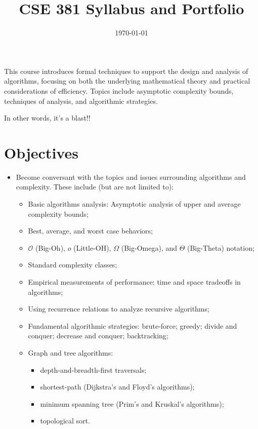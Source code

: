 \documentclass[12pt]{amsart}
\title{CSE 381 Syllabus and Portfolio}
\date{\today}
\begin{document}
\maketitle
This course introduces formal techniques to support the design and
  analysis of algorithms, focusing on both the underlying mathematical
  theory and practical considerations of efficiency. Topics include
  asymptotic complexity bounds, techniques of analysis, and
  algorithmic strategies.

In other words, it's a blast!!

\section{Objectives}
\begin{itemize}
\item Become conversant with the topics and issues surrounding
    algorithms and complexity. These include (but are not limited to):
    \begin{itemize}
          \item Basic algorithms analysis: Asymptotic analysis of upper and
              average complexity bounds;
          \item Best, average, and worst case behaviors;
          \item $\mathcal{O}$ (Big-Oh), $o$ (Little-OH), $\Omega$ (Big-Omega), and
              $\Theta$ (Big-Theta) notation;
          \item Standard complexity classes;
          \item Empirical measurements of performance; time and space tradeoffs
              in algorithms;
          \item Using recurrence relations to analyze recursive algorithms;
          \item Fundamental algorithmic strategies: brute-force; greedy; divide
              and conquer; decrease and conquer; backtracking;
          \item Graph and tree algorithms: \begin{itemize}
          	\item depth-and-breadth-first traversals;
              	\item shortest-path (Dijkstra's and Floyd's algorithms);
		\item minimum spanning tree (Prim's and Kruskal's algorithms);
		\item topological sort.
	\end{itemize}
      \end{itemize}
\end{itemize}
\end{document}
